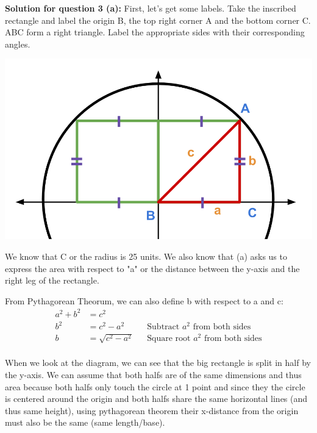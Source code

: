 \documentclass[12pt]{book}
\begin{document}
\begin{enumerate}

\vspace{0.5cm}
\textbf{Solution for question 3 (a):}
\vspace{0.3cm}
First, let's get some labels. Take the inscribed rectangle and 
label the origin B, the top right corner A and the bottom corner C.
ABC form a right triangle. Label the appropriate sides 
with their corresponding angles.

\begin{center}
    \includegraphics[scale = 0.25]{A3-3 Diagram.png}
\end{center}

\vspace{0.3cm}
We know that C or the radius is 25 units. We also know that (a) 
asks us to express the area with respect to "a" or the distance 
between the y-axis and the right leg of the rectangle.

From Pythagorean Theorum, we can also define b with respect to a and c:
\begin{align*}
    a^2 + b^2 &= c^2 \\
    b^2 &= c^2 - a^2 && \text{Subtract } a^2 \text{ from both sides}\\
    b &= \sqrt{c^2 - a^2} && \text{Square root } a^2 \text{ from both sides}\\
\end{align*}

\vspace{-0.5cm}
When we look at the diagram, we can see that the big rectangle is split in 
half by the y-axis. We can assume that both halfs are of the same dimensions 
and thus area because both halfs only touch the circle at 1 point and since 
they the circle is centered around the origin and both halfs share the same 
horizontal lines (and thus same height), using pythagorean theorem their 
x-distance from the origin must also be the same (same length/base).


\end{enumerate}
\end{document}
